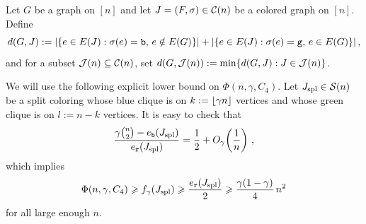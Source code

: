\begin{definition}
Let $G$ be a graph on $[n]$ and let $J=(F,\sigma)\in{\mathcal C}(n)$ be a colored graph on $[n]$. Define
$$d(G,J):=\lvert\{e\in E(J):\sigma(e)={\normalfont\texttt b},\, e\notin E(G)\}\rvert+\lvert\{e\in E(J):\sigma(e)={\normalfont\texttt g},\, e\in E(G)\}\rvert\,,$$
and for a subset ${\mathcal J}(n)\subseteq{\mathcal C}(n)$, set $d(G,{\mathcal J}(n)):=\min\{d(G,J):J\in{\mathcal J}(n)\}$.
\end{definition}

We will use the following explicit lower bound on $\Phi(n,\gamma,C_4)$. Let $J_{\mathrm{spl}}\in{\mathcal S}(n)$ be a split coloring whose blue clique is on $k:=\lfloor\gamma n\rfloor$ vertices and whose green clique is on $l:=n-k$ vertices. It is easy to check that
$$\frac{\gamma\binom{n}{2}-e_{\normalfont\texttt b}(J_{\mathrm{spl}})}{e_{\normalfont\texttt r}(J_{\mathrm{spl}})}=\frac{1}{2}+O_\gamma\!\left(\frac1n\right)\,,$$
which implies
\begin{equation}
\Phi(n,\gamma,C_4)\geqslant f_\gamma(J_{\mathrm{spl}})\geqslant\frac{e_{\normalfont\texttt r}(J_{\mathrm{spl}})}{2}\geqslant\frac{\gamma(1-\gamma)}{4}\,n^2 \label{eqn:Phi0-LB}
\end{equation}
for all large enough $n$.

